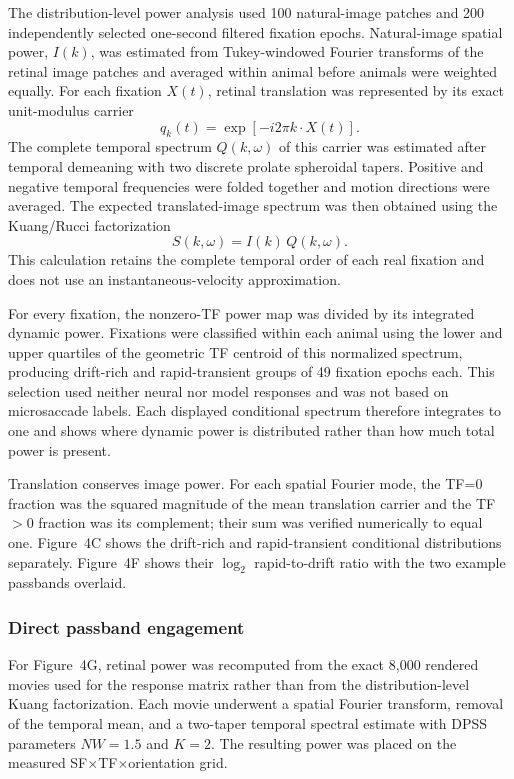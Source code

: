 \documentclass{lite}
\begin{document}
The distribution-level power analysis used 100 natural-image patches and 200 independently selected one-second filtered fixation epochs. Natural-image spatial power, $I(k)$, was estimated from Tukey-windowed Fourier transforms of the retinal image patches and averaged within animal before animals were weighted equally. For each fixation $X(t)$, retinal translation was represented by its exact unit-modulus carrier
\begin{equation}
q_k(t)=\exp[-i2\pi k\cdot X(t)] .
\end{equation}
The complete temporal spectrum $Q(k,\omega)$ of this carrier was estimated after temporal demeaning with two discrete prolate spheroidal tapers. Positive and negative temporal frequencies were folded together and motion directions were averaged. The expected translated-image spectrum was then obtained using the Kuang/Rucci factorization
\begin{equation}
S(k,\omega)=I(k)\,Q(k,\omega).
\end{equation}
This calculation retains the complete temporal order of each real fixation and does not use an instantaneous-velocity approximation.

For every fixation, the nonzero-TF power map was divided by its integrated dynamic power. Fixations were classified within each animal using the lower and upper quartiles of the geometric TF centroid of this normalized spectrum, producing drift-rich and rapid-transient groups of 49 fixation epochs each. This selection used neither neural nor model responses and was not based on microsaccade labels. Each displayed conditional spectrum therefore integrates to one and shows where dynamic power is distributed rather than how much total power is present.

Translation conserves image power. For each spatial Fourier mode, the TF=0 fraction was the squared magnitude of the mean translation carrier and the TF$>0$ fraction was its complement; their sum was verified numerically to equal one. Figure~4C shows the drift-rich and rapid-transient conditional distributions separately. Figure~4F shows their $\log_2$ rapid-to-drift ratio with the two example passbands overlaid.

\subsubsection{Direct passband engagement}

For Figure~4G, retinal power was recomputed from the exact 8{,}000 rendered movies used for the response matrix rather than from the distribution-level Kuang factorization. Each movie underwent a spatial Fourier transform, removal of the temporal mean, and a two-taper temporal spectral estimate with DPSS parameters $NW=1.5$ and $K=2$. The resulting power was placed on the measured SF$\times$TF$\times$orientation grid.
\end{document}
